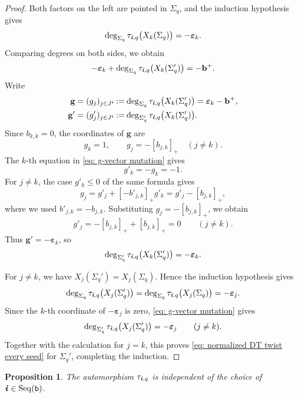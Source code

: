\documentclass[12pt, leqno]{amsart}
\numberwithin{equation}{section}
\theoremstyle{plain}
\newtheorem{proposition}[lemma]{Proposition}
\theoremstyle{definition}
\renewcommand{\le}{\leqslant}
\newcommand{\seteq}{\mathbin{:=}}
\newcommand{\ve}{\boldsymbol{\varepsilon}}
\newcommand{\ii}{ \textbf{\textit{i}}}
\newcommand{\bfb}{\mathbf{b}}
\newcommand{\bfg}{\mathbf{g}}
\newcommand{\ttb}{\mathtt{b}}
\newcommand{\Seq}{\mathrm{Seq}}
\begin{document}
\begin{proof}
Both factors on the left are pointed in $\Sigma_q$, and
the induction hypothesis gives
\[
\deg_{\Sigma_q}
\tau_{\ii,q}\bigl(X_k(\Sigma_q)\bigr)=-\ve_k.
\]
Comparing degrees on both sides, we obtain
\[
-\ve_k+
\deg_{\Sigma_q}
\tau_{\ii,q}\bigl(X_k(\Sigma_q')\bigr)
=
-\bfb^+.
\]
Write
\[
\begin{aligned}
\bfg=(g_j)_{j\in J^\ii}
&\seteq
\deg_{\Sigma_q}
\tau_{\ii,q}\bigl(X_k(\Sigma_q')\bigr)
=
\ve_k-\bfb^+,\\
\bfg'=(g'_j)_{j\in J^\ii}
&\seteq
\deg_{\Sigma_q'}
\tau_{\ii,q}\bigl(X_k(\Sigma_q')\bigr).
\end{aligned}
\]
Since $b_{k,k}=0$, the coordinates of $\bfg$ are
\[
g_k=1,
\qquad
g_j=-[b_{j,k}]_+
\quad(j\ne k).
\]
The $k$-th equation in \eqref{eq: g-vector mutation} gives
\[
g'_k=-g_k=-1.
\]
For $j\ne k$, the case $g'_k\le0$ of the same formula gives
\[
g_j
=
g'_j+[-b'_{j,k}]_+g'_k
=
g'_j-[b_{j,k}]_+,
\]
where we used $b'_{j,k}=-b_{j,k}$.
Substituting $g_j=-[b_{j,k}]_+$, we obtain
\[
g'_j = -[b_{j,k}]_++[b_{j,k}]_+ = 0 \qquad(j\ne k).
\]
Thus $\bfg'=-\ve_k$, so
\[
\deg_{\Sigma_q'} \tau_{\ii,q}\bigl(X_k(\Sigma_q')\bigr)
= -\ve_k.
\]

For $j\ne k$, we have $X_j(\Sigma_q')=X_j(\Sigma_q)$.
Hence the induction hypothesis gives
\[
\begin{aligned}
\deg_{\Sigma_q} \tau_{\ii,q}\bigl(X_j(\Sigma_q')\bigr)
= \deg_{\Sigma_q} \tau_{\ii,q}\bigl(X_j(\Sigma_q)\bigr)
=-\ve_j.
\end{aligned}
\]
Since the $k$-th coordinate of $-\ve_j$ is zero,
\eqref{eq: g-vector mutation} gives
\[
\deg_{\Sigma_q'}
\tau_{\ii,q}\bigl(X_j(\Sigma_q')\bigr)
=
-\ve_j
\qquad(j\ne k).
\]
Together with the calculation for $j=k$, this proves
\eqref{eq: normalized DT twist every seed} for $\Sigma_q'$,
completing the induction.
\end{proof}

\begin{proposition}
\label{prop: normalized DT twist independence}
The automorphism $\tau_{\ii,q}$ is independent of the choice of
$\ii\in\Seq(\ttb)$.
\end{proposition}
\end{document}

